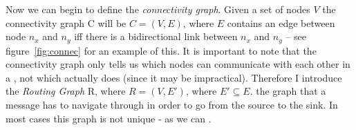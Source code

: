 Now we can begin to define the \emph{connectivity graph}. Given a set of nodes $V$ the connectivity graph C will be $C = (V, E)$, where $E$ contains an edge between node $n_x$ and $n_y$ iff there is a bidirectional link between $n_x$ and $n_y$ -- see figure~\ref{fig:connec} for an example of this. It is important to note that the connectivity graph only tells us which nodes can communicate with each other in a \manet, not which actually does (since it may be impractical). Therefore I introduce the \emph{Routing Graph} R, where $R = (V, E\prime)$, where $E\prime \subseteq E$. the graph that a message has to navigate through in order to go from the source to the sink. In most cases this graph is not unique - as we can .




 













